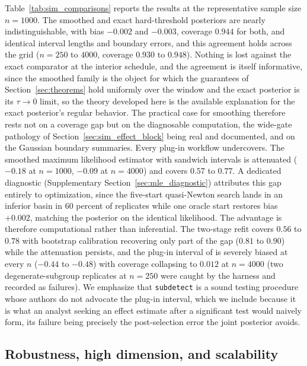 \documentclass[11pt]{article}
\theoremstyle{definition}
\theoremstyle{plain}
\begin{document}
Table~\ref{tab:sim_comparisons} reports the results at the representative sample size $n=1000$. The smoothed and exact hard-threshold posteriors are nearly indistinguishable, with bias $-0.002$ and $-0.003$, coverage $0.944$ for both, and identical interval lengths and boundary errors, and this agreement holds across the grid ($n=250$ to $4000$, coverage $0.930$ to $0.948$). Nothing is lost against the exact comparator at the interior schedule, and the agreement is itself informative, since the smoothed family is the object for which the guarantees of Section~\ref{sec:theorems} hold uniformly over the window and the exact posterior is its $\tau\to0$ limit, so the theory developed here is the available explanation for the exact posterior's regular behavior. The practical case for smoothing therefore rests not on a coverage gap but on the diagnosable computation, the wide-gate pathology of Section~\ref{sec:sim_effect_block} being real and documented, and on the Gaussian boundary summaries. Every plug-in workflow undercovers. The smoothed maximum likelihood estimator with sandwich intervals is attenuated ($-0.18$ at $n=1000$, $-0.09$ at $n=4000$) and covers $0.57$ to $0.77$. A dedicated diagnostic (Supplementary Section~\ref{sec:mle_diagnostic}) attributes this gap entirely to optimization, since the five-start quasi-Newton search lands in an inferior basin in $60$ percent of replicates while one oracle start restores bias $+0.002$, matching the posterior on the identical likelihood. The advantage is therefore computational rather than inferential. The two-stage refit covers $0.56$ to $0.78$ with bootstrap calibration recovering only part of the gap ($0.81$ to $0.90$) while the attenuation persists, and the plug-in interval of \citet{Fan2017} is severely biased at every $n$ ($-0.44$ to $-0.48$) with coverage collapsing to $0.012$ at $n=4000$ (two degenerate-subgroup replicates at $n=250$ were caught by the harness and recorded as failures). We emphasize that \texttt{subdetect} is a sound testing procedure whose authors do not advocate the plug-in interval, which we include because it is what an analyst seeking an effect estimate after a significant test would naively form, its failure being precisely the post-selection error the joint posterior avoids.



\subsection{Robustness, high dimension, and scalability}
\label{sec:simulation_variable_selection}
\end{document}
